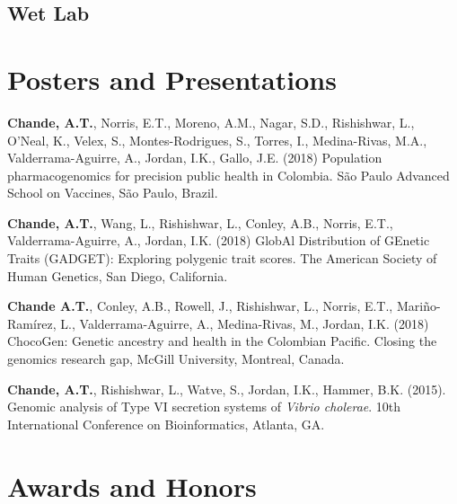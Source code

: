\documentclass[11pt,letterpaper,sans]{moderncv} %
\begin{document}
\subsection{Wet Lab}




\section{Posters and Presentations}

\begin{etaremune}
\item \textbf{Chande, A.T.}, Norris, E.T., Moreno, A.M., Nagar, S.D., Rishishwar, L., O'Neal, K., Velex, S., Montes-Rodrigues, S., Torres, I., Medina-Rivas, M.A., Valderrama-Aguirre, A., Jordan, I.K., Gallo, J.E. (2018) Population pharmacogenomics for precision public health in Colombia.  S{\~a}o Paulo Advanced School on Vaccines,  S{\~a}o Paulo, Brazil.
\item \textbf{Chande, A.T.}, Wang, L., Rishishwar, L., Conley, A.B., Norris, E.T., Valderrama-Aguirre, A., Jordan, I.K. (2018) GlobAl Distribution of GEnetic Traits (GADGET): Exploring polygenic trait scores.  The American Society of Human Genetics, San Diego, California.
\item \textbf{Chande A.T.}, Conley, A.B., Rowell, J., Rishishwar, L., Norris, E.T.,  Mari{\~{n}}o-Ram{{\'i}}rez, L., Valderrama-Aguirre, A.,  Medina-Rivas, M., Jordan, I.K. (2018) ChocoGen: Genetic ancestry and health in the Colombian Pacific. Closing the genomics research gap, McGill University, Montreal, Canada.
\item \textbf{Chande, A.T.}, Rishishwar, L., Watve, S., Jordan, I.K., Hammer, B.K. (2015). Genomic analysis of Type VI secretion systems of \textit{Vibrio cholerae}. 10th International Conference on Bioinformatics, Atlanta, GA.
\end{etaremune}

\section{Awards and Honors}
\end{document}
